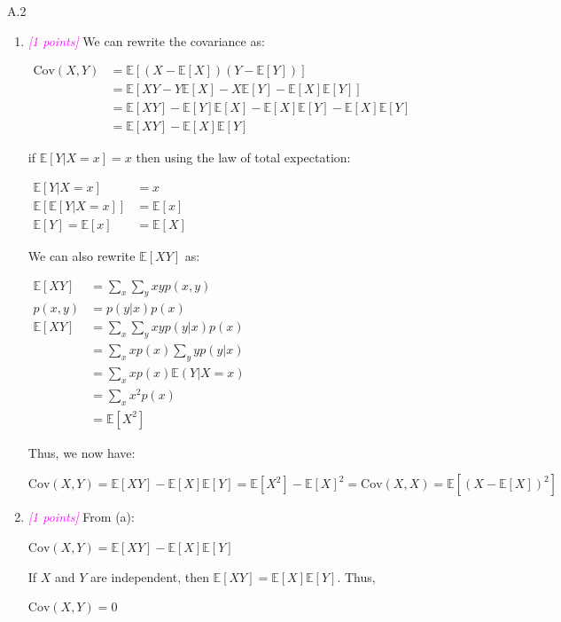 \documentclass{article}
\newcommand{\1}{\mathbf{1}}
\newcommand{\E}{\mathbb{E}}
\newcommand{\points}[1]{\small\textcolor{magenta}{\emph{[#1 points]}} \normalsize}
\begin{document}
A.2 
\begin{enumerate}
\item \points{1} We can rewrite the covariance as:
\begin{center}
	$\begin{aligned}
	\text{Cov}(X,Y)&=\E[(X-\E[X])(Y-\E[Y])]\\
	&=\E[XY-Y\E[X]-X\E[Y]-\E[X]\E[Y]]\\
	&=\E[XY]-\E[Y]\E[X]-\E[X]\E[Y]-\E[X]\E[Y]\\
	&=\E[XY]-\E[X]\E[Y]
	\end{aligned}$
\end{center}

if $\E[Y|X=x]=x$ then using the law of total expectation:
\begin{center}
	$\begin{aligned}
	\E[Y|X=x]&=x\\
	\E[\E[Y|X=x]]&=\E[x]\\
	\E[Y]=\E[x]&=\E[X]
	\end{aligned}$
\end{center}
We can also rewrite $\E[XY]$ as:
\begin{center}
$\begin{aligned} \E[XY] &= \sum_{x} \sum_{y} xy p(x,y)\\
p(x,y) &= p(y|x)p(x)\\
\E[XY] &= \sum_{x} \sum_{y} xy p(y|x)p(x)\\
&=\sum_{x}xp(x)\sum_{y}yp(y|x)\\
&=\sum_{x}xp(x)\E(Y|X=x)\\
&=\sum_{x}x^2p(x)\\
&=\E[X^2]\end{aligned}$
\end{center}
Thus, we now have:
\begin{center}
$\text{Cov}(X,Y)=\E[XY]-\E[X]\E[Y]=\E[X^2]-\E[X]^2=\text{Cov}(X,X)=\E[(X-\E[X])^2]$
\end{center}


\item \points{1} From (a):
\begin{center}
	$\text{Cov}(X,Y)=\E[XY]-\E[X]\E[Y]$
\end{center}
If $X$ and $Y$ are independent, then $\E[XY]=\E[X]\E[Y]$. Thus,
\begin{center}
	$\text{Cov}(X,Y)=0$
\end{center}
\end{enumerate}
\end{document}
